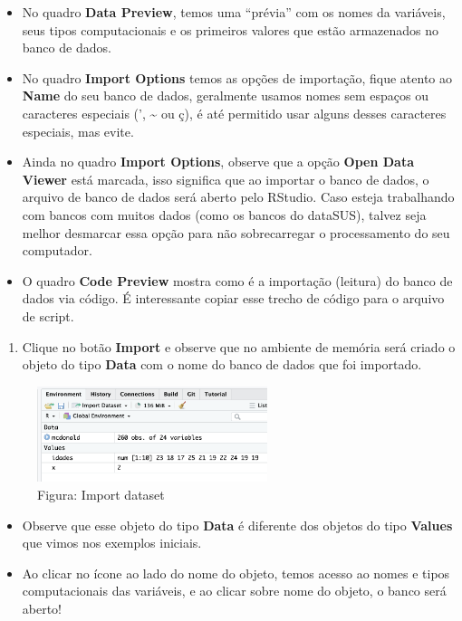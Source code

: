 \documentclass[
]{book}
\providecommand{\tightlist}{%
  \setlength{\itemsep}{0pt}\setlength{\parskip}{0pt}}
\begin{document}
\begin{itemize}
\item
  No quadro \textbf{Data Preview}, temos uma ``prévia'' com os nomes da variáveis, seus tipos computacionais e os primeiros valores que estão armazenados no banco de dados.
\item
  No quadro \textbf{Import Options} temos as opções de importação, fique atento ao \textbf{Name} do seu banco de dados, geralmente usamos nomes sem espaços ou caracteres especiais (', \textasciitilde{} ou ç), é até permitido usar alguns desses caracteres especiais, mas evite.
\item
  Ainda no quadro \textbf{Import Options}, observe que a opção \textbf{Open Data Viewer} está marcada, isso significa que ao importar o banco de dados, o arquivo de banco de dados será aberto pelo RStudio. Caso esteja trabalhando com bancos com muitos dados (como os bancos do dataSUS), talvez seja melhor desmarcar essa opção para não sobrecarregar o processamento do seu computador.
\item
  O quadro \textbf{Code Preview} mostra como é a importação (leitura) do banco de dados via código. É interessante copiar esse trecho de código para o arquivo de script.
\end{itemize}

\begin{enumerate}
\def\labelenumi{\arabic{enumi}.}
\setcounter{enumi}{3}
\tightlist
\item
  Clique no botão \textbf{Import} e observe que no ambiente de memória será criado o objeto do tipo \textbf{Data} com o nome do banco de dados que foi importado.
\end{enumerate}

\begin{figure}
\centering
\includegraphics[width=0.6\textwidth,height=\textheight]{telaImportObjetoData.png}
\caption{ Figura: Import dataset}
\end{figure}

\begin{itemize}
\item
  Observe que esse objeto do tipo \textbf{Data} é diferente dos objetos do tipo \textbf{Values} que vimos nos exemplos iniciais.
\item
  Ao clicar no ícone ao lado do nome do objeto, temos acesso ao nomes e tipos computacionais das variáveis, e ao clicar sobre nome do objeto, o banco será aberto!
\end{itemize}
\end{document}
